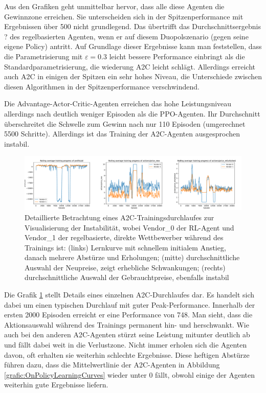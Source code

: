 Aus den Grafiken geht unmittelbar hervor, dass alle diese Agenten die Gewinnzone erreichen.
Sie unterscheiden sich in der Spitzenperformance mit Ergebnissen über 500 nicht grundlegend.
Das übertrifft das Durchschnittsergebnis ? des regelbasierten Agenten, wenn er auf diesem Duopolszenario (gegen seine eigene Policy) antritt.
Auf Grundlage dieser Ergebnisse kann man feststellen, dass die Parametrisierung mit $\varepsilon=0.3$ leicht bessere Performance einbringt als die Standardparametrisierung, die wiederung A2C leicht schlägt.
Allerdings erreicht auch A2C in einigen der Spitzen ein sehr hohes Niveau, die Unterschiede zwischen diesen Algorithmen in der Spitzenperformance verschwindend.

Die Advantage-Actor-Critic-Agenten erreichen das hohe Leistungsniveau allerdings nach deutlich weniger Episoden als die PPO-Agenten.
Ihr Durchschnitt überschreitet die Schwelle zum Gewinn nach nur 110 Episoden (umgerechnet 5500 Schritte).
Allerdings ist das Training der A2C-Agenten ausgesprochen instabil.
\begin{figure}[htbp]
	\centering
	\includegraphics[width=\textwidth]{main/a2c_detailed_analysis.pdf}
	\caption{
		Detaillierte Betrachtung eines A2C-Trainingsdurchlaufes zur Visualisierung der Instabilität, wobei Vendor\_0 der RL-Agent und Vendor\_1 der regelbasierte, direkte Wettbewerber während des Trainings ist:
		(links) Lernkurve mit schnellem initialem Anstieg, danach mehrere Abstürze und Erholungen;
		(mitte) durchschnittliche Auswahl der Neupreise, zeigt erhebliche Schwankungen;
		(rechts) durchschnittliche Auswahl der Gebrauchtpreise, ebenfalls instabil
	}
	\label{grafic:A2CInstability}
\end{figure}
Die Grafik \ref{grafic:A2CInstability} stellt Details eines einzelnen A2C-Durchlaufes dar.
Es handelt sich dabei um einen typischen Durchlauf mit guter Peak-Performance.
Innerhalb der ersten 2000 Episoden erreicht er eine Performance von 748.
Man sieht, dass die Aktionsauswahl während des Trainings permanent hin- und herschwankt.
Wie auch bei den anderen A2C-Agenten stürzt seine Leistung mitunter deutlich ab und fällt dabei weit in die Verlustzone.
Nicht immer erholen sich die Agenten davon, oft erhalten sie weiterhin schlechte Ergebnisse.
Diese heftigen Abstürze führen dazu, dass die Mittelwertlinie der A2C-Agenten in Abbildung \ref{grafic:OnPolicyLearningCurves} wieder unter 0 fällt, obwohl einige der Agenten weiterhin gute Ergebnisse liefern.

